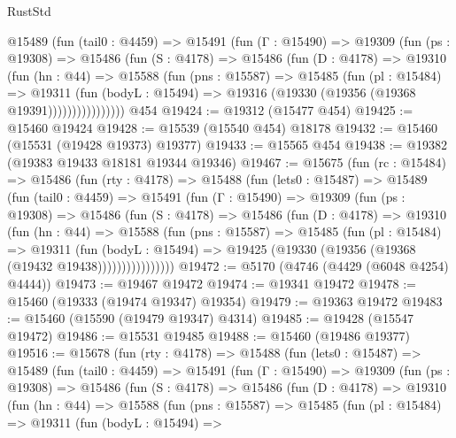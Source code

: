 \begin{lexlean}{RustStd}
\begin{coremodule}
          @15489
            (fun (tail0 : @4459) =>
            @15491
              (fun (Γ : @15490) =>
              @19309
                (fun (ps : @19308) =>
                @15486
                  (fun (S : @4178) =>
                  @15486
                    (fun (D : @4178) =>
                    @19310
                      (fun (hn : @44) =>
                      @15588
                        (fun (pns : @15587) =>
                        @15485
                          (fun (pl : @15484) =>
                          @19311
                            (fun (bodyL : @15494) =>
                            @19316 (@19330 (@19356 (@19368 @19391))))))))))))))))
    @454
@19424 := @19312 (@15477 @454)
@19425 := @15460 @19424
@19428 := @15539 (@15540 @454) @18178
@19432 := @15460 (@15531 (@19428 @19373) @19377)
@19433 := @15565 @454
@19438 := @19382 (@19383 @19433 @18181 @19344 @19346)
@19467 := @15675
    (fun (rc : @15484) =>
    @15486
      (fun (rty : @4178) =>
      @15488
        (fun (lets0 : @15487) =>
        @15489
          (fun (tail0 : @4459) =>
          @15491
            (fun (Γ : @15490) =>
            @19309
              (fun (ps : @19308) =>
              @15486
                (fun (S : @4178) =>
                @15486
                  (fun (D : @4178) =>
                  @19310
                    (fun (hn : @44) =>
                    @15588
                      (fun (pns : @15587) =>
                      @15485
                        (fun (pl : @15484) =>
                        @19311
                          (fun (bodyL : @15494) =>
                          @19425 (@19330 (@19356 (@19368 (@19432 @19438))))))))))))))))
@19472 := @5170 (@4746 (@4429 (@6048 @4254) @4444))
@19473 := @19467 @19472
@19474 := @19341 @19472
@19478 := @15460 (@19333 (@19474 @19347) @19354)
@19479 := @19363 @19472
@19483 := @15460 (@15590 (@19479 @19347) @4314)
@19485 := @19428 (@15547 @19472)
@19486 := @15531 @19485
@19488 := @15460 (@19486 @19377)
@19516 := @15678
    (fun (rty : @4178) =>
    @15488
      (fun (lets0 : @15487) =>
      @15489
        (fun (tail0 : @4459) =>
        @15491
          (fun (Γ : @15490) =>
          @19309
            (fun (ps : @19308) =>
            @15486
              (fun (S : @4178) =>
              @15486
                (fun (D : @4178) =>
                @19310
                  (fun (hn : @44) =>
                  @15588
                    (fun (pns : @15587) =>
                    @15485
                      (fun (pl : @15484) =>
                      @19311
                        (fun (bodyL : @15494) =>

\end{coremodule}
\end{lexlean}
